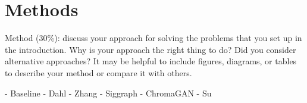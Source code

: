 \section{Methods}
Method (30\%): discuss your approach for solving the problems that you set up in the introduction. Why is your approach the right thing to do? Did you consider alternative approaches? It may be helpful to include figures, diagrams, or tables to describe your method or compare it with others.

- Baseline
- Dahl
- Zhang
- Siggraph
- ChromaGAN
- Su
